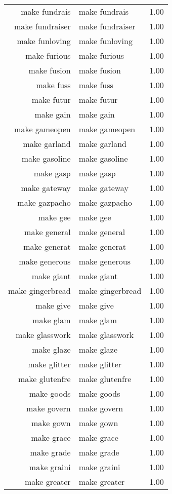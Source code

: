 \begin{table}[ht]
\begin{tabular}{rlr}
  make fundrais & make fundrais & 1.00 \\ 
  make fundraiser & make fundraiser & 1.00 \\ 
  make funloving & make funloving & 1.00 \\ 
  make furious & make furious & 1.00 \\ 
  make fusion & make fusion & 1.00 \\ 
  make fuss & make fuss & 1.00 \\ 
  make futur & make futur & 1.00 \\ 
  make gain & make gain & 1.00 \\ 
  make gameopen & make gameopen & 1.00 \\ 
  make garland & make garland & 1.00 \\ 
  make gasoline & make gasoline & 1.00 \\ 
  make gasp & make gasp & 1.00 \\ 
  make gateway & make gateway & 1.00 \\ 
  make gazpacho & make gazpacho & 1.00 \\ 
  make gee & make gee & 1.00 \\ 
  make general & make general & 1.00 \\ 
  make generat & make generat & 1.00 \\ 
  make generous & make generous & 1.00 \\ 
  make giant & make giant & 1.00 \\ 
  make gingerbread & make gingerbread & 1.00 \\ 
  make give & make give & 1.00 \\ 
  make glam & make glam & 1.00 \\ 
  make glasswork & make glasswork & 1.00 \\ 
  make glaze & make glaze & 1.00 \\ 
  make glitter & make glitter & 1.00 \\ 
  make glutenfre & make glutenfre & 1.00 \\ 
  make goods & make goods & 1.00 \\ 
  make govern & make govern & 1.00 \\ 
  make gown & make gown & 1.00 \\ 
  make grace & make grace & 1.00 \\ 
  make grade & make grade & 1.00 \\ 
  make graini & make graini & 1.00 \\ 
  make greater & make greater & 1.00 \\ 

\end{tabular}
\end{table}
